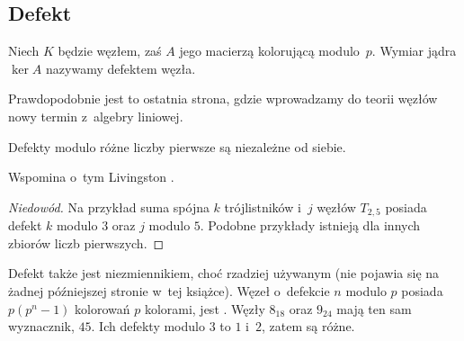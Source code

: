 %

\subsection{Defekt}
%
\begin{definition}[defekt]
    Niech $K$ będzie węzłem, zaś $A$ jego macierzą kolorującą modulo~$p$.
    Wymiar jądra $\ker A$ nazywamy defektem węzła.
\end{definition}

Prawdopodobnie jest to ostatnia strona, gdzie wprowadzamy do teorii węzłów nowy termin z~algebry liniowej.

\begin{proposition}
\label{no_relation_defects}%
    Defekty modulo różne liczby pierwsze są niezależne od siebie.
\end{proposition}

Wspomina o~tym Livingston \cite[s. 145]{livingston1993}.

\begin{proof}[Niedowód]
    Na przykład suma spójna $k$ trójlistników i~$j$ węzłów $T_{2,5}$ posiada defekt $k$ modulo $3$ oraz $j$ modulo $5$.
    Podobne przykłady istnieją dla innych zbiorów liczb pierwszych.
\end{proof}

Defekt także jest niezmiennikiem, choć rzadziej używanym (nie pojawia się na żadnej późniejszej stronie w~tej książce).
Węzeł o~defekcie $n$ modulo $p$ posiada $p(p^n-1)$ kolorowań $p$ kolorami, jest \cite[twierdzenie 2]{taalman2005}.
Węzły $8_{18}$ oraz $9_{24}$ mają ten sam wyznacznik, $45$.
Ich defekty modulo $3$ to $1$ i~$2$, zatem są różne.
%

%
